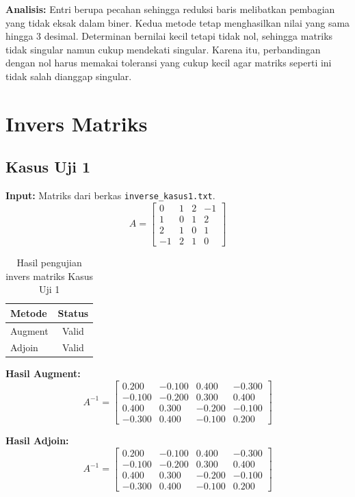 \documentclass[12pt,a4paper]{report}
\begin{document}
\textbf{Analisis:} Entri berupa pecahan sehingga reduksi baris melibatkan pembagian yang tidak eksak dalam biner. Kedua metode tetap menghasilkan nilai yang sama hingga 3 desimal. Determinan bernilai kecil tetapi tidak nol, sehingga matriks tidak singular namun cukup mendekati singular. Karena itu, perbandingan dengan nol harus memakai toleransi yang cukup kecil agar matriks seperti ini tidak salah dianggap singular.

\section{Invers Matriks}
 
\subsection{Kasus Uji 1}
\textbf{Input:} Matriks dari berkas \texttt{inverse\_kasus1.txt}.
\[
A = \begin{bmatrix}
     0 &1 &2 &-1 \\
    1 &0 &1 &2 \\
    2 &1 &0 &1 \\
    -1 &2 &1& 0
\end{bmatrix}
\]
 
\begin{table}[H]
    \centering
    \caption{Hasil pengujian invers matriks Kasus Uji 1}
    \begin{tabular}{|l|c|}
        \hline
        \textbf{Metode} & \textbf{Status} \\
        \hline
        Augment & Valid \\
        Adjoin  & Valid \\
        \hline
    \end{tabular}
\end{table}
 
\textbf{Hasil Augment:}
\[
A^{-1} = \begin{bmatrix}
     0.200 & -0.100 &  0.400 & -0.300 \\
    -0.100 & -0.200 &  0.300 &  0.400 \\
     0.400 &  0.300 & -0.200 & -0.100 \\
    -0.300 &  0.400 & -0.100 &  0.200
\end{bmatrix}
\]
 
\textbf{Hasil Adjoin:}
\[
A^{-1} = \begin{bmatrix}
     0.200 & -0.100 &  0.400 & -0.300 \\
    -0.100 & -0.200 &  0.300 &  0.400 \\
     0.400 &  0.300 & -0.200 & -0.100 \\
    -0.300 &  0.400 & -0.100 &  0.200
\end{bmatrix}
\]
 
\end{document}
